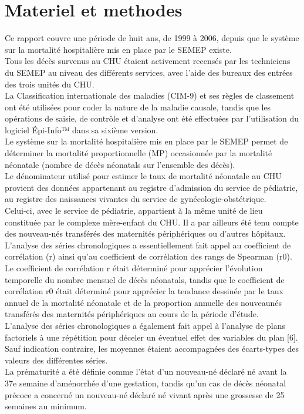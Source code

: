 
\section{Materiel et methodes}


Ce rapport couvre une période de huit ans, de 1999 à 2006,
depuis que le système sur la mortalité hospitalière mis en
place par le SEMEP existe.\\ 

Tous les décès survenus au CHU
étaient activement recensés par les techniciens du SEMEP au
niveau des différents services, avec l’aide des bureaux des
entrées des trois unités du CHU.\\

La Classification internationale des maladies (CIM-9) et
ses règles de classement ont été utilisées pour coder la nature
de la maladie causale, tandis que les opérations de saisie, de
contrôle et d’analyse ont été effectuées par l’utilisation du
logiciel Épi-Info™ dans sa sixième version.\\

Le système sur la mortalité hospitalière mis en place par le
SEMEP permet de déterminer la mortalité proportionnelle
(MP) occasionnée par la mortalité néonatale (nombre de
décès néonatals sur l’ensemble des décès).\\
Le dénominateur
utilisé pour estimer le taux de mortalité néonatale au CHU
provient des données appartenant au registre d’admission du
service de pédiatrie, au registre des naissances vivantes du
service de gynécologie-obstétrique. \\

Celui-ci, avec le service
de pédiatrie, appartient à la même unité de lieu constituée par
le complexe mère-enfant du CHU. Il a par ailleurs été tenu
compte des nouveau-nés transférés des maternités périphériques
ou d’autres hôpitaux.\\

L’analyse des séries chronologiques a essentiellement fait
appel au coefficient de corrélation (r) ainsi qu’au coefficient
de corrélation des rangs de Spearman (r0). \\ 

Le coefficient de
corrélation r était déterminé pour apprécier l’évolution
temporelle du nombre mensuel de décès néonatals, tandis
que le coefficient de corrélation r0 était déterminé pour
apprécier la tendance dessinée par le taux annuel de la
mortalité néonatale et de la proportion annuelle des nouveaunés
transférés des maternités périphériques au cours de la
période d’étude.\\ 

L’analyse des séries chronologiques a
également fait appel à l’analyse de plans factoriels à une
répétition pour déceler un éventuel effet des variables du plan
[6]. Sauf indication contraire, les moyennes étaient accompagnées
des écarts-types des valeurs des différentes séries.\\

La prématurité a été définie comme l’état d’un nouveau-né
déclaré né avant la 37e semaine d’aménorrhée d’une
gestation, tandis qu’un cas de décès néonatal précoce a
concerné un nouveau-né déclaré né vivant après une
grossesse de 25 semaines au minimum.
